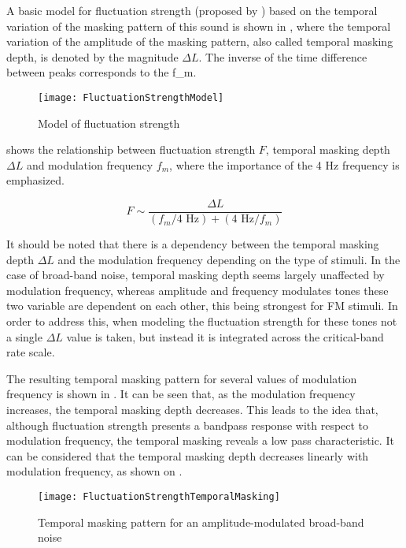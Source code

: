 \documentclass[../main.tex]{subfiles}
\begin{document}
\begin{theoreticalbackground}
A basic model for fluctuation strength (proposed by
\textcite[pp.~254]{Fastl2007Psychoacoustics}) based on the temporal variation of
the masking pattern of this sound is shown in , where
the temporal variation of the amplitude of the masking pattern, also called
temporal masking depth, is denoted by the magnitude $\Delta L$. The inverse of
the time difference between peaks corresponds to the \gls{f_m}.

\begin{figure}[!ht]
  \centering
  \texttt{[image: FluctuationStrengthModel]}
  \caption{Model of fluctuation
    strength~\cite[pp. 254]{Fastl2007Psychoacoustics}}
\label{fig:flucstrenmodel}
\end{figure}

 shows the relationship between fluctuation
strength $F$, temporal masking depth $\Delta L$ and modulation frequency
$f_{m}$, where the importance of the 4 Hz frequency is emphasized.

\begin{equation}
  F \sim \frac{\Delta L}{(f_{m}/4\text{ Hz}) + (4\text{ Hz}/f_{m})}
  \label{eq:flucstrentempmaskmodfreq}
\end{equation}

It should be noted that there is a dependency between the temporal masking depth
$\Delta L$ and the modulation frequency depending on the type of stimuli. In the
case of broad-band noise, temporal masking depth seems largely unaffected by
modulation frequency, whereas amplitude and frequency modulates tones these two
variable are dependent on each other, this being strongest for \gls{FM} stimuli.
In order to address this, when modeling the fluctuation strength for these tones
not a single $\Delta L$ value is taken, but instead it is integrated across the
critical-band rate scale.

The resulting temporal masking pattern for several values of modulation
frequency is shown in . It can be seen that, as the
modulation frequency increases, the temporal masking depth decreases. This leads
to the idea that, although fluctuation strength presents a bandpass response
with respect to modulation frequency, the temporal masking reveals a low pass
characteristic. It can be considered that the temporal masking depth decreases
linearly with modulation frequency, as shown on .

\begin{figure}[!ht]
  \centering
  \texttt{[image: FluctuationStrengthTemporalMasking]}
  \caption{Temporal masking pattern for an amplitude-modulated broad-band
    noise~\cite[pp. 255]{Fastl2007Psychoacoustics}}
\label{fig:flucstrenmasking}
\end{figure}


\end{theoreticalbackground}
\end{document}
